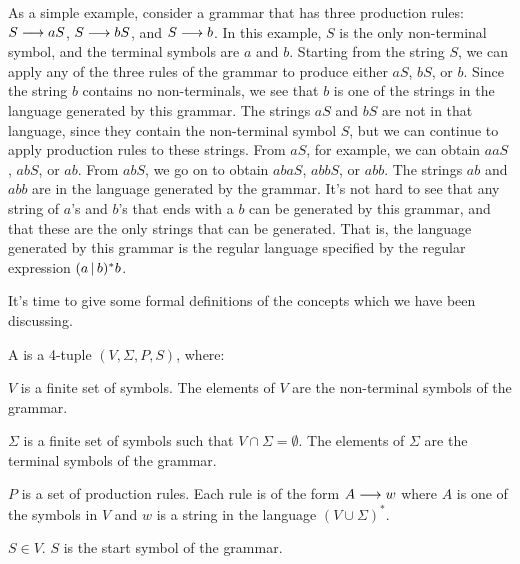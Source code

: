 As a simple example, consider a grammar that has three production
rules: $S\longrightarrow aS$, $S\longrightarrow bS$, and $S\longrightarrow b$.
In this example, $S$ is the only non-terminal symbol, and
the terminal symbols are $a$ and $b$.  Starting from the
string $S$, we can apply any of the three rules of the grammar
to produce either $aS$, $bS$, or $b$.  Since the string $b$ contains
no non-terminals, we see that $b$ is one of the strings in the language
generated by this grammar.  The strings $aS$ and $bS$ are not in
that language, since they contain the non-terminal symbol $S$,
but we can continue to apply production rules to these strings.
From $aS$, for example, we can obtain $aaS$, $abS$, or $ab$.
From $abS$, we go on to obtain $abaS$, $abbS$, or $abb$.
The strings $ab$ and $abb$ are in the language generated by
the grammar.  It's not hard to see that any string of $a$'s and
$b$'s that ends with a $b$ can be generated by this grammar,
and that these are the only strings that can be generated.
That is, the language generated by this grammar is the regular
language specified by the regular expression $(a\hbox{$\,|\,$} b)^{*}b$.

It's time to give some formal definitions of the concepts which
we have been discussing.

\begin{definition}
A  is a 4-tuple $(V,\Sigma,P,S)$,
where:

$V$ is a finite set of symbols.  The elements of $V$
are the non-terminal symbols of the grammar.

$\Sigma$ is a finite set of symbols such that $V\cap\Sigma=\emptyset$.
The elements of $\Sigma$ are the terminal symbols of the grammar.

$P$ is a set of production rules.  Each rule is of the
form $A\longrightarrow w$ where $A$ is one of the symbols in $V$ and
$w$ is a string in the language $(V\cup\Sigma)^*$.

$S\in V$.  $S$ is the start symbol of the grammar.

\end{definition}

